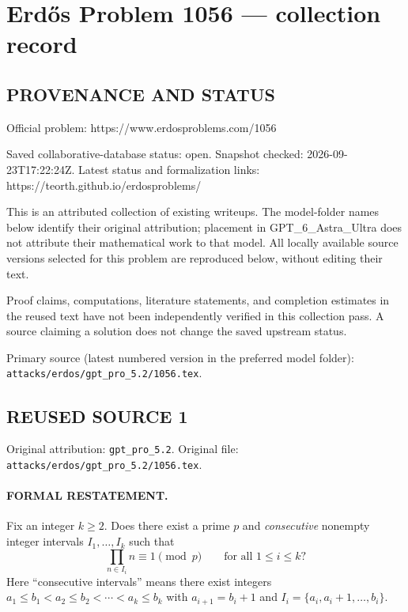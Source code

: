 \section*{Erd\H{o}s Problem 1056 --- collection record}

\subsection*{PROVENANCE AND STATUS}
Official problem: https://www.erdosproblems.com/1056

Saved collaborative-database status: open.
Snapshot checked: 2026-09-23T17:22:24Z.
Latest status and formalization links: https://teorth.github.io/erdosproblems/

This is an attributed collection of existing writeups. The model-folder names below identify their original attribution; placement in GPT\_6\_Astra\_Ultra does not attribute their mathematical work to that model. All locally available source versions selected for this problem are reproduced below, without editing their text.

Proof claims, computations, literature statements, and completion estimates in the reused text have not been independently verified in this collection pass. A source claiming a solution does not change the saved upstream status.

Primary source (latest numbered version in the preferred model folder): \texttt{attacks/erdos/gpt\_pro\_5.2/1056.tex}.

\subsection*{REUSED SOURCE 1}
Original attribution: \texttt{gpt\_pro\_5.2}.
Original file: \texttt{attacks/erdos/gpt\_pro\_5.2/1056.tex}.


\paragraph{FORMAL RESTATEMENT.}
Fix an integer $k\ge 2$.
Does there exist a prime $p$ and \emph{consecutive} nonempty integer intervals $I_1,\dots,I_k$ such that
\[
\prod_{n\in I_i} n \equiv 1 \pmod p\qquad\text{for all }1\le i\le k?
\]
Here “consecutive intervals” means there exist integers $a_1\le b_1 < a_2\le b_2 < \cdots < a_k\le b_k$ with $a_{i+1}=b_i+1$ and $I_i=\{a_i,a_i+1,\dots,b_i\}$.

